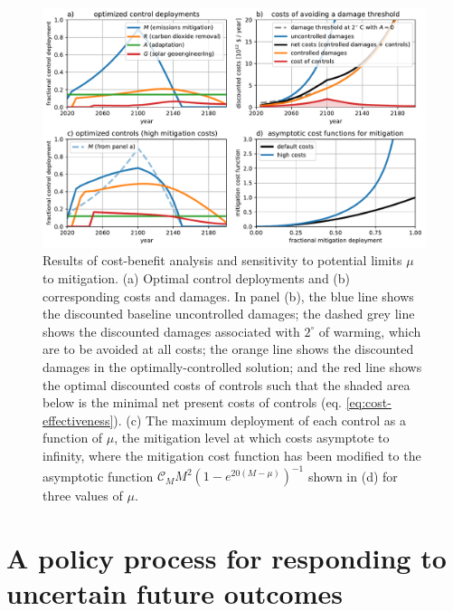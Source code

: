 \documentclass[9pt,twocolumn,twoside,lineno]{pnas-new}
\begin{document}
\begin{figure}%
\centering
\includegraphics[width=11.4cm]{figures/default-temp_controls_and_damages.pdf}
\caption{Results of cost-benefit analysis and sensitivity to potential limits $\mu$ to mitigation. (a) Optimal control deployments and (b) corresponding costs and damages. In panel (b), the blue line shows the discounted baseline uncontrolled damages; the dashed grey line shows the discounted damages associated with $2^{\circ}$ of warming, which are to be avoided at all costs; the orange line shows the discounted damages in the optimally-controlled solution; and the red line shows the optimal discounted costs of controls such that the shaded area below is the minimal net present costs of controls (eq. \ref{eq:cost-effectiveness}). (c) The maximum deployment of each control as a function of $\mu$, the mitigation level at which costs asymptote to infinity, where the mitigation cost function has been modified to the asymptotic function $\mathcal{C}_{M} M^{2} \left( 1 - e^{20 (M - \mu)} \right)^{-1}$ shown in (d) for three values of $\mu$.}
\label{fig:cost-effectiveness}
\end{figure}

\section*{A policy process for responding to uncertain future outcomes}
\end{document}
